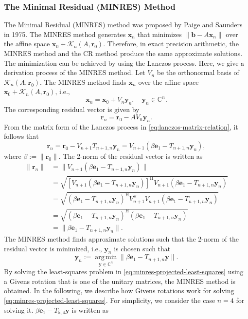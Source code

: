 \subsubsection{{The Minimal Residual (MINRES) Method}}\label{subsec:minres}
{The Minimal Residual (MINRES) method  was proposed by Paige and Saunders in 1975. The MINRES method generates $\bm x_n$ that minimizes $\|\bm b-A\bm x_n\|$ over the affine space $\bm x_0+\mathcal K_n(A,\bm r_0)$. Therefore, in exact precision arithmetic, the MINRES method and the CR method produce the same approximate solutions. The minimization can be achieved by using the Lanczos process.}
{Here, we give a derivation process of the MINRES method. Let $V_n$ be the orthonormal basis of $\mathcal K_n(A,\bm r_0)$. The MINRES method finds $\bm x_n$ over the affine space $\bm x_0+\mathcal K_n(A,\bm r_0)$, i.e.,}
\begin{equation}\label{eq:minres-affine-solution}\bm x_n=\bm x_0+V_n\bm y_n,\quad\bm y_n\in\mathbb C^n.\end{equation}
{The corresponding residual vector is given by}
\[\bm r_n=\bm r_0-AV_n\bm y_n.\]
{From the matrix form of the Lanczos process in \eqref{eq:lanczos-matrix-relation}, it follows that}
\[\bm r_n=\bm r_0-V_{n+1}T_{n+1,n}\bm y_n=V_{n+1}(\beta\bm e_1-T_{n+1,n}\bm y_n),\]
{where $\beta:=\|\bm r_0\|$. The 2-norm of the residual vector is written as}
\[\begin{aligned}
\|\bm r_n\|&=\|V_{n+1}(\beta\bm e_1-T_{n+1,n}\bm y_n)\|\\
&=\sqrt{[V_{n+1}(\beta\bm e_1-T_{n+1,n}\bm y_n)]^{\mathrm H}V_{n+1}(\beta\bm e_1-T_{n+1,n}\bm y_n)}\\
&=\sqrt{(\beta\bm e_1-T_{n+1,n}\bm y_n)^{\mathrm H}V_{n+1}^{\mathrm H}V_{n+1}(\beta\bm e_1-T_{n+1,n}\bm y_n)}\\
&=\sqrt{(\beta\bm e_1-T_{n+1,n}\bm y_n)^{\mathrm H}(\beta\bm e_1-T_{n+1,n}\bm y_n)}\\
&=\|\beta\bm e_1-T_{n+1,n}\bm y_n\|.
\end{aligned}\]
{The MINRES method finds approximate solutions such that the 2-norm of the residual vector is minimized, i.e., $\bm y_n$ is chosen such that}
\begin{equation}\label{eq:minres-projected-least-squares}\bm y_n:=\operatorname*{arg\,min}_{\bm y\in\mathbb C^n}\|\beta\bm e_1-T_{n+1,n}\bm y\|.\end{equation}
{By solving the least-squares problem in \eqref{eq:minres-projected-least-squares} using a Givens rotation that is one of the unitary matrices, the MINRES method is obtained. In the following, we describe how Givens rotations work for solving \eqref{eq:minres-projected-least-squares}. For simplicity, we consider the case $n=4$ for solving it. $\beta\bm e_1-T_{5,4}\bm y$ is written as}
